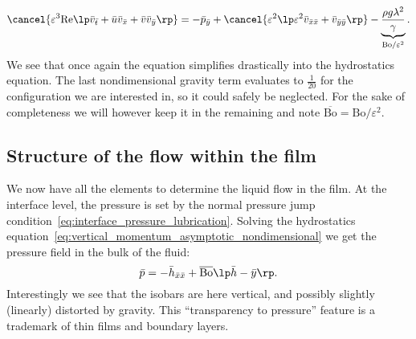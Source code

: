 \begin{equation}
\cancel{\varepsilon^3 \text{Re}\lp\bar v_{\bar t} + \bar u \bar v_{\bar x} + \bar v \bar v_{\bar y}\rp} = -\bar p_{\bar y} + \cancel{\varepsilon^2 \lp \varepsilon^2 \bar v_{\bar x \bar x} + \bar v_{\bar y \bar y}\rp} - \underbrace{\frac{\rho g \lambda^2}{\gamma}}_{\text{Bo}/\varepsilon^2}.
\label{eq:vertical_momentum_asymptotic_nondimensional}
\end{equation}
We see that once again the equation simplifies drastically into the hydrostatics equation. The last nondimensional gravity term evaluates to $\tfrac{\text{1}}{\text{20}}$ for the configuration we are interested in, so it could safely be neglected. For the sake of completeness we will however keep it in the remaining and note $\overline{\text{Bo}} = \text{Bo}/\varepsilon^2$.
\subsection{Structure of the flow within the film}
We now have all the elements to determine the liquid flow in the film. 
 At the interface level, the pressure is set by the normal pressure jump condition~\eqref{eq:interface_pressure_lubrication}. Solving the hydrostatics equation~\eqref{eq:vertical_momentum_asymptotic_nondimensional} we get the pressure field in the bulk of the fluid:
\begin{equation}
\bar p = -\bar h_{\bar x \bar x} + \overline{\text{Bo}} \lp\bar h - \bar y\rp.
\end{equation}
Interestingly we see that the isobars are here vertical, and possibly slightly (linearly) distorted by gravity. This ``transparency to pressure'' feature is a trademark of thin films and boundary layers.

